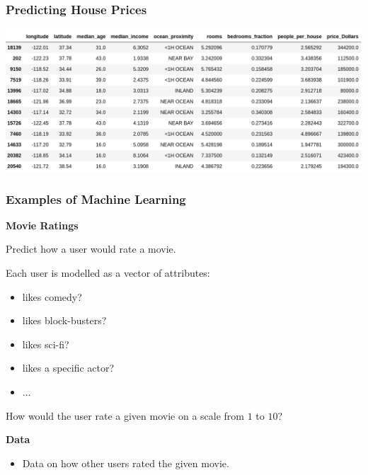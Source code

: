 \documentclass[xcolor=table]{beamer}
\begin{document}
\begin{frame}[t]
\frametitle{Predicting House Prices}
\begin{center}
    \includegraphics[scale=0.2]{housing_data.png}
\end{center}
\end{frame}

\begin{frame}[t]
\frametitle{Examples of Machine Learning}
\textcolor{orange2}{\textbf{Movie Ratings}}

Predict how a user would rate a movie.

\pause

\medskip

Each user is modelled as a vector of attributes:
\begin{itemize}
    \item likes comedy?  
    \item likes block-busters?
    \item likes sci-fi?
    \item likes a specific actor?
    \item $\ldots$
\end{itemize}

\pause

How would the user rate a given movie on a scale from $1$ to $10$?

\bigskip

\textbf{Data}
\begin{itemize}
    \item Data on how other users rated the given movie. 
\end{itemize}
\end{frame}
\end{document}
